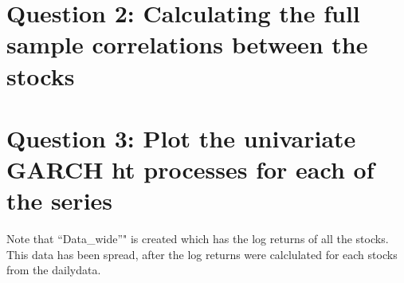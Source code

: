 \documentclass[11pt,preprint, authoryear]{elsarticle}
\let\origtable\table
\let\endorigtable\endtable
\renewenvironment{table}[1][2] {
    \expandafter\origtable\expandafter[H]
} {
    \endorigtable
}
\numberwithin{equation}{section}
\numberwithin{figure}{section}
\numberwithin{table}{section}
\begin{document}
\section{\texorpdfstring{Question 2: Calculating the full sample
correlations between the stocks
\label{Question 2: Calculate the full sample correlations between the stocks}}{Question 2: Calculating the full sample correlations between the stocks }}\label{question-2-calculating-the-full-sample-correlations-between-the-stocks}

\begin{table}[H]
\centering
{}
\caption{Unconditional Correlations Between Stocks \label{t}} 
\end{table}

\section{\texorpdfstring{Question 3: Plot the univariate GARCH ht
processes for each of the series
\label{Question 3: Plot the univariate GARCH ht processes for each of the series}}{Question 3: Plot the univariate GARCH ht processes for each of the series }}\label{question-3-plot-the-univariate-garch-ht-processes-for-each-of-the-series}

Note that ``Data\_wide''" is created which has the log returns of all
the stocks. This data has been spread, after the log returns were
calclulated for each stocks from the dailydata.
\end{document}
